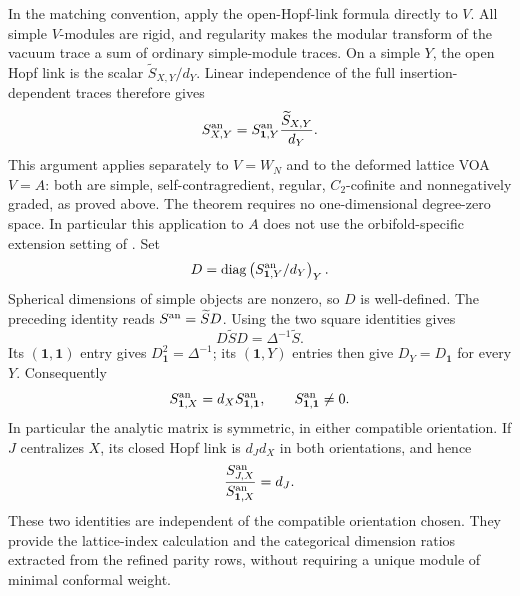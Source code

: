 \documentclass[11pt,a4paper]{article}
\numberwithin{equation}{section}
\theoremstyle{definition}\newtheorem{definition}[theorem]{Definition}
\theoremstyle{remark}\newtheorem{remark}[theorem]{Remark}
\begin{document}
In the matching convention, apply the open-Hopf-link formula
\cite[Theorem 5.2, equation (5.5)]{mcrae} directly to $V$.
All simple $V$-modules are rigid, and regularity makes the modular
transform of the vacuum trace a sum of ordinary simple-module traces.
On a simple $Y$, the open Hopf link is the scalar
$\widetilde S_{X,Y}/d_Y$. Linear independence of the full
insertion-dependent traces therefore gives
\[
 S^{\rm an}_{X,Y}
  =S^{\rm an}_{\mathbf1,Y}\frac{\widetilde S_{X,Y}}{d_Y}.
\]
This argument applies separately to $V=W_N$ and to the deformed
lattice VOA $V=A$: both are simple, self-contragredient, regular,
$C_2$-cofinite and nonnegatively graded, as proved above. The theorem
requires no one-dimensional degree-zero space. In particular this
application to $A$ does not use the orbifold-specific extension
setting of \cite[Remark 5.21]{mcrae}. Set
\[
 D=\operatorname{diag}\left(
       S^{\rm an}_{\mathbf1,Y}/d_Y\right)_Y.
\]
Spherical dimensions of simple objects are nonzero, so $D$ is
well-defined.  The preceding identity reads
$S^{\rm an}=\widetilde SD$.
Using the two square identities gives
\[
 D\widetilde SD=\Delta^{-1}\widetilde S.
\]
Its $(\mathbf1,\mathbf1)$ entry gives
$D_{\mathbf1}^2=\Delta^{-1}$; its $(\mathbf1,Y)$ entries then give
$D_Y=D_{\mathbf1}$ for every $Y$.
Consequently
\begin{equation}\label{audit:eq:analytic-vacuum-row}
 S^{\rm an}_{\mathbf1,X}
    =d_X S^{\rm an}_{\mathbf1,\mathbf1},\qquad
 S^{\rm an}_{\mathbf1,\mathbf1}\ne0.
\end{equation}
In particular the analytic matrix is symmetric, in either compatible
orientation. If $J$ centralizes $X$, its closed Hopf link is
$d_Jd_X$ in both orientations, and hence
\begin{equation}\label{audit:eq:analytic-centralizer-row}
 \frac{S^{\rm an}_{J,X}}{S^{\rm an}_{\mathbf1,X}}=d_J.
\end{equation}
These two identities are independent of the compatible orientation
chosen.  They provide the lattice-index calculation and the
categorical dimension ratios extracted from the refined parity
rows, without requiring a unique module of minimal conformal
weight.
\end{document}
